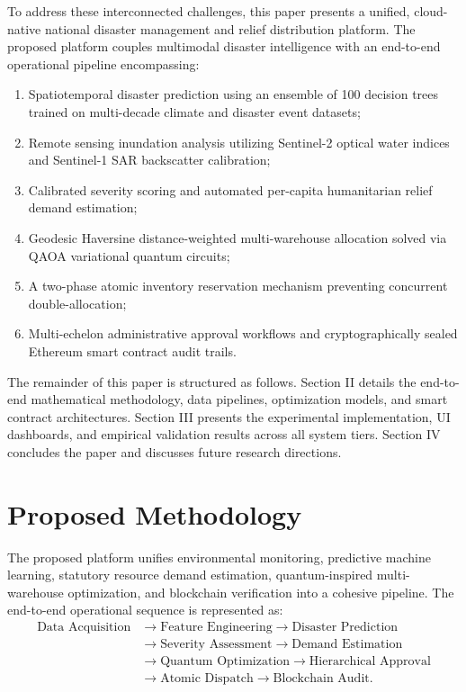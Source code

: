 \documentclass[conference]{IEEEtran}
\begin{document}
To address these interconnected challenges, this paper presents a unified, cloud-native national disaster management and relief distribution platform. The proposed platform couples multimodal disaster intelligence with an end-to-end operational pipeline encompassing:
\begin{enumerate}
    \item Spatiotemporal disaster prediction using an ensemble of 100 decision trees trained on multi-decade climate and disaster event datasets;
    \item Remote sensing inundation analysis utilizing Sentinel-2 optical water indices and Sentinel-1 SAR backscatter calibration;
    \item Calibrated severity scoring and automated per-capita humanitarian relief demand estimation;
    \item Geodesic Haversine distance-weighted multi-warehouse allocation solved via QAOA variational quantum circuits;
    \item A two-phase atomic inventory reservation mechanism preventing concurrent double-allocation;
    \item Multi-echelon administrative approval workflows and cryptographically sealed Ethereum smart contract audit trails.
\end{enumerate}

The remainder of this paper is structured as follows. Section II details the end-to-end mathematical methodology, data pipelines, optimization models, and smart contract architectures. Section III presents the experimental implementation, UI dashboards, and empirical validation results across all system tiers. Section IV concludes the paper and discusses future research directions.

\section{Proposed Methodology}
The proposed platform unifies environmental monitoring, predictive machine learning, statutory resource demand estimation, quantum-inspired multi-warehouse optimization, and blockchain verification into a cohesive pipeline. The end-to-end operational sequence is represented as:
\begin{equation}
\begin{aligned}
\text{Data Acquisition} &\longrightarrow \text{Feature Engineering} \longrightarrow \text{Disaster Prediction} \\
&\longrightarrow \text{Severity Assessment} \longrightarrow \text{Demand Estimation} \\
&\longrightarrow \text{Quantum Optimization} \longrightarrow \text{Hierarchical Approval} \\
&\longrightarrow \text{Atomic Dispatch} \longrightarrow \text{Blockchain Audit}.
\end{aligned}
\label{eq:pipeline}
\end{equation}
\end{document}

